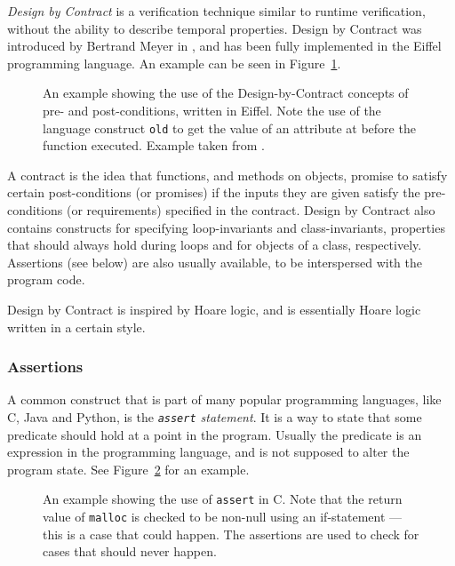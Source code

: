 \documentclass[a4paper,11pt]{kth-mag}
\begin{document}
\textit{Design by Contract} is a verification technique similar to runtime
verification, without the ability to describe temporal properties. Design by
Contract was introduced by Bertrand Meyer in \cite{meyer92applyingdbc}, and has
been fully implemented in the Eiffel programming language. An example can be
seen in Figure~\ref{figure-dbc-example}.

\begin{figure}[h!]
	\begin{center}
	\begin{minipage}{0.7\textwidth}
    \lstset{language=Eiffel}
		
	\end{minipage}
	\end{center}
  \caption{An example showing the use of the Design-by-Contract concepts of
    pre- and post-conditions, written in Eiffel. Note the use of the language
    construct \texttt{old} to get the value of an attribute at before the
    function executed. Example taken from \cite{meyer92applyingdbc}.}
	\label{figure-dbc-example}
\end{figure}

A contract is the idea that functions, and methods on objects, promise to
satisfy certain post-conditions (or promises) if the inputs they are given
satisfy the pre-conditions (or requirements) specified in the contract. Design
by Contract also contains constructs for specifying loop-invariants and
class-invariants, properties that should always hold during loops and for
objects of a class, respectively. Assertions (see below) are also usually
available, to be interspersed with the program code.

Design by Contract is inspired by Hoare logic, and is essentially Hoare logic
written in a certain style.


\subsubsection{Assertions}

A common construct that is part of many popular programming languages, like C,
Java and Python, is the \textit{\texttt{assert} statement}. It is a way to
state that some predicate should hold at a point in the program. Usually the
predicate is an expression in the programming language, and is not supposed to
alter the program state. See Figure~\ref{figure-c-assert-example} for an
example.

\begin{figure}[h!]
	\begin{center}
	\begin{minipage}{0.7\textwidth}
    \lstset{language=C}
		
	\end{minipage}
	\end{center}
  \caption{An example showing the use of \texttt{assert} in C. Note that the
    return value of \texttt{malloc} is checked to be non-null using an
    if-statement --- this is a case that could happen. The assertions are used
    to check for cases that should never happen.}
	\label{figure-c-assert-example}
\end{figure}
\end{document}
